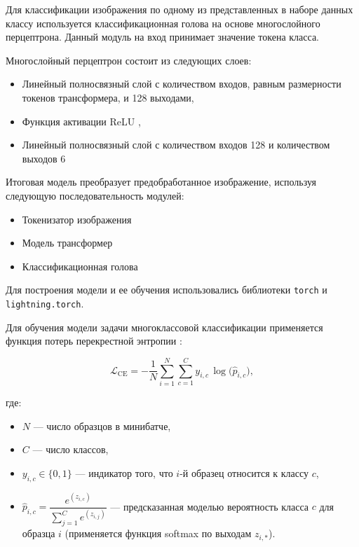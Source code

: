 \documentclass[times,specification,annotation]{itmo-student-thesis}
\begin{document}
Для классификации изображения по одному из представленных в наборе данных классу используется классификационная голова на основе многослойного перцептрона. Данный модуль на вход принимает значение токена класса. 

Многослойный перцептрон состоит из следующих слоев:

\begin{itemize}
    \item Линейный полносвязный слой с количеством входов, равным размерности токенов трансформера, и 128 выходами,
    \item Функция активации ReLU \cite{relu},
    \item Линейный полносвязный слой с количеством входов 128 и количеством выходов 6
\end{itemize}

Итоговая модель преобразует предобработанное изображение, используя следующую последовательность модулей:

\begin{itemize}
    \item Токенизатор изображения
    \item Модель трансформер
    \item Классификационная голова
\end{itemize}



Для построения модели и ее обучения использовались библиотеки  \texttt{torch} и \texttt{lightning.torch}.

Для обучения модели задачи многоклассовой классификации применяется функция потерь перекрестной энтропии \cite{goodfellow_dl}: 

$$
\mathcal{L}_{\mathrm{CE}}
= -\frac{1}{N} \sum_{i=1}^{N} \sum_{c=1}^{C} y_{i,c} \,\log\bigl(\hat{p}_{i,c}\bigr),
$$

где: 

\begin{itemize}
  \item $N$ — число образцов в минибатче,
  \item $C$ — число классов,
  \item $y_{i,c}\in\{0,1\}$ — индикатор того, что $i$-й образец относится к классу $c$,
  \item $\hat{p}_{i,c}=\dfrac{e^{(z_{i,c})}}{\sum_{j=1}^Ce^{(z_{i,j})}}$ — предсказанная моделью вероятность класса $c$ для образца $i$ (применяется функция softmax по выходам $z_{i,*}$).
\end{itemize}
\end{document}
